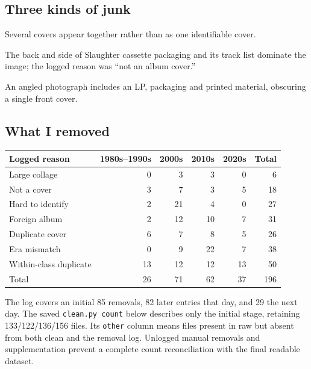 \documentclass[11pt]{article}
\begin{document}
\subsection*{Three kinds of junk}
\begin{center}\end{center}
Several covers appear together rather than as one identifiable cover.
\begin{center}\end{center}
The back and side of Slaughter cassette packaging and its track list dominate the image; the logged reason was ``not an album cover.''
\begin{center}\end{center}
An angled photograph includes an LP, packaging and printed material, obscuring a single front cover.

\subsection*{What I removed}
\begin{center}\small
\begin{tabular}{lrrrrr}\toprule
Logged reason &1980s--1990s&2000s&2010s&2020s&Total\\\midrule
Large collage&0&3&3&0&6\\
Not a cover&3&7&3&5&18\\
Hard to identify&2&21&4&0&27\\
Foreign album&2&12&10&7&31\\
Duplicate cover&6&7&8&5&26\\
Era mismatch&0&9&22&7&38\\
Within-class duplicate&13&12&12&13&50\\\midrule
Total&26&71&62&37&196\\\bottomrule
\end{tabular}
\end{center}
The log covers an initial 85 removals, 82 later entries that day, and 29 the next day. The saved \texttt{clean.py count} below describes only the initial stage, retaining 133/122/136/156 files. Its \texttt{other} column means files present in raw but absent from both clean and the removal log. Unlogged manual removals and supplementation prevent a complete count reconciliation with the final readable dataset.
\end{document}
